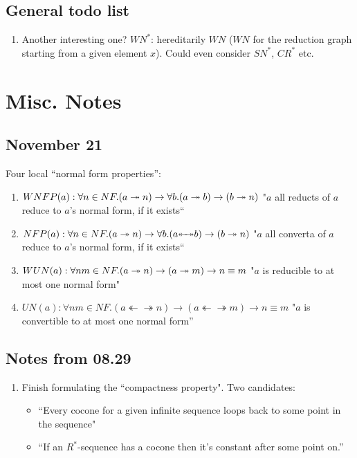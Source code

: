 \documentclass{scrartcl}
\newcommand{\thra}{\twoheadrightarrow}
\newcommand{\thla}{\twoheadleftarrow}
\newcommand{\thlra}{{\thla\!\!\thra}}
\begin{document}
\subsection{General todo list}
\begin{enumerate}
  \item  Another interesting one? $WN^*$: hereditarily $WN$ ($WN$ for the reduction graph starting from a given element $x$). Could even consider $SN^*$, $CR^*$ etc. 
\end{enumerate}


\newpage

\section{Misc. Notes}


\subsection*{November 21}
Four local ``normal form properties'':
\begin{enumerate}
  \item $WNFP(a) : \forall n \in NF. (a \twoheadrightarrow n) \to \forall b. (a \twoheadrightarrow b) \to (b \twoheadrightarrow n)$
    "$a$ all reducts of $a$ reduce to $a$'s normal form, if it exists``
  \item $NFP(a) : \forall n \in NF. (a \tto n) \to \forall b. (a \thlra b) \to (b \tto n)$
    "$a$ all converta of $a$ reduce to $a$'s normal form, if it exists``
  \item $WUN(a) : \forall n m \in NF. (a \twoheadrightarrow n) \to (a \twoheadrightarrow m) \to n \equiv m$
    "$a$ is reducible to at most one normal form"
  \item $UN(a) : \forall n m \in NF. (a \thlra n) \to (a \thlra m) \to n \equiv m$
    "$a$ is convertible to at most one normal form''
\end{enumerate}

\subsection{Notes from 08.29}
\begin{enumerate}
  \item Finish formulating the ``compactness property".  Two candidates:
  \begin{itemize}
    \item ``Every cocone for a given infinite sequence loops back to some point in the sequence"
    \item ``If an $R^*$-sequence has a cocone then it's constant after some point on.''
  \end{itemize}
\end{enumerate} 
\end{document}
